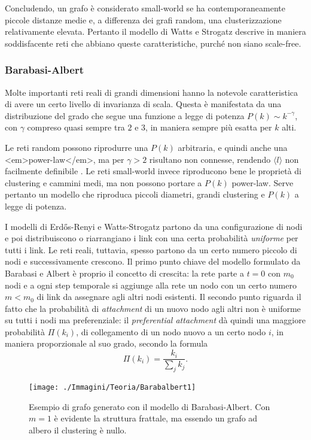 Concludendo, un grafo è considerato small-world se ha contemporaneamente piccole distanze medie e, a differenza dei grafi random, una clusterizzazione relativamente elevata. Pertanto il modello di Watts e Strogatz descrive in maniera soddisfacente reti che abbiano queste caratteristiche, purché non siano scale-free.

\subsubsection{Barabasi-Albert}
Molte importanti reti reali di grandi dimensioni hanno la notevole caratteristica di avere un certo livello di invarianza di scala. Questa è manifestata da una distribuzione del grado che segue una funzione a legge di potenza $P(k)\sim k^{-\gamma}$, con $\gamma$ compreso quasi sempre tra $2$ e $3$, in maniera sempre più esatta per $k$ alti.

Le reti random possono riprodurre una $P(k)$ arbitraria, e quindi anche una <em>power-law</em>, ma per $\gamma > 2$ risultano non connesse, rendendo $\langle l \rangle$ non facilmente definibile \parencite{Barbalbert2002}. Le reti small-world invece riproducono bene le proprietà di clustering e cammini medi, ma non possono portare a $P(k)$ power-law. Serve pertanto un modello che riproduca piccoli diametri, grandi clustering e $P(k)$ a legge di potenza.

I modelli di Erdős-Renyi e Watts-Strogatz partono da una configurazione di nodi e poi distribuiscono o riarrangiano i link con una certa probabilità \emph{uniforme} per tutti i link. Le reti reali, tuttavia, spesso partono da un certo numero piccolo di nodi e successivamente crescono. Il primo punto chiave del modello formulato da Barabasi e Albert è proprio il concetto di crescita: la rete parte a $t=0$ con $m_0$ nodi e a ogni step temporale si aggiunge alla rete un nodo con un certo numero $m < m_0$ di link da assegnare agli altri nodi esistenti. Il secondo punto riguarda il fatto che la probabilità di \emph{attachment} di un nuovo nodo agli altri non è uniforme su tutti i nodi ma preferenziale: il \emph{preferential attachment} dà quindi una maggiore probabilità $\Pi (k_i)$, di collegamento di un nodo nuovo a un certo nodo $i$, in maniera proporzionale al suo grado, secondo la formula
$$\Pi (k_i) = \frac{k_i}{\sum_j k_j}.$$

\begin{figure}[t!]
	\centering
	\texttt{[image: ./Immagini/Teoria/Barabalbert1]}
	\caption[Albero scale-free]{Esempio di grafo generato con il modello di Barabasi-Albert. Con $m=1$ \`e evidente la struttura frattale, ma essendo un grafo ad albero il clustering \`e nullo.}
	\label{fig:barabalbero}
\end{figure}

